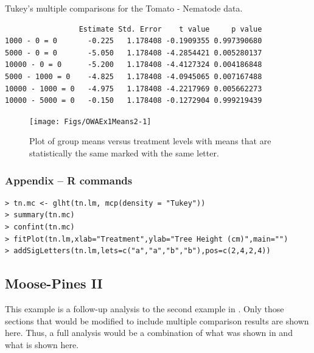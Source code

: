 \documentclass[10pt,openany]{book}\usepackage[]{graphicx}\usepackage[]{color}
\makeatletter
\newenvironment{kframe}{%
 \def\at@end@of@kframe{}%
 \ifinner\ifhmode%
  \def\at@end@of@kframe{\end{minipage}}%
  \begin{minipage}{\columnwidth}%
 \fi\fi%
 \def\FrameCommand##1{\hskip\@totalleftmargin \hskip-\fboxsep
 \colorbox{shadecolor}{##1}\hskip-\fboxsep
     \hskip-\linewidth \hskip-\@totalleftmargin \hskip\columnwidth}%
 \MakeFramed {\advance\hsize-\width
   \@totalleftmargin\z@ \linewidth\hsize
   \@setminipage}}%
 {\par\unskip\endMakeFramed%
 \at@end@of@kframe}
\newenvironment{knitrout}{}{} %
\makeatother
\begin{document}
\begin{table}[h]
  \centering
  \caption{Tukey's multiple comparisons for the Tomato - Nematode data.}\label{tab:OWAEx1HSD}
\begin{knitrout}
\color{fgcolor}\begin{kframe}
\begin{verbatim}
                 Estimate Std. Error    t value     p value
1000 - 0 = 0       -0.225   1.178408 -0.1909355 0.997390680
5000 - 0 = 0       -5.050   1.178408 -4.2854421 0.005280137
10000 - 0 = 0      -5.200   1.178408 -4.4127324 0.004186848
5000 - 1000 = 0    -4.825   1.178408 -4.0945065 0.007167488
10000 - 1000 = 0   -4.975   1.178408 -4.2217969 0.005662273
10000 - 5000 = 0   -0.150   1.178408 -0.1272904 0.999219439
\end{verbatim}
\end{kframe}
\end{knitrout}
\end{table}

\begin{knitrout}
\color{fgcolor}\begin{figure}[hbtp]

{\centering \texttt{[image: Figs/OWAEx1Means2-1]} 

}

\caption[Plot of group means versus treatment levels with means that are statistically the same marked with the same letter]{Plot of group means versus treatment levels with means that are statistically the same marked with the same letter.}\label{fig:OWAEx1Means2}
\end{figure}


\end{knitrout}

\subsubsection*{Appendix -- R commands}
\begin{Verbatim}[formatcom=\color{red},xleftmargin=5mm,commandchars=\\\{\}]
> tn.mc <- glht(tn.lm, mcp(density = "Tukey"))
> summary(tn.mc)
> confint(tn.mc)
> fitPlot(tn.lm,xlab="Treatment",ylab="Tree Height (cm)",main="")
> addSigLetters(tn.lm,lets=c("a","a","b","b"),pos=c(2,4,2,4))
\end{Verbatim}

\subsection{Moose-Pines II}
This example is a follow-up analysis to the second example in .  Only those sections that would be modified to include multiple comparison results are shown here.  Thus, a full analysis would be a combination of what was shown in  and what is shown here.
\end{document}

